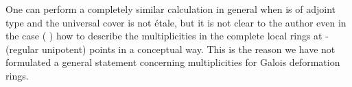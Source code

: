 \documentclass[11pt,reqno]{amsart}
\makeatletter
\theoremstyle{definition}
\DeclareMathOperator{\SL}{SL}
\newcounter{mathrecordid}
\newcommand{\mathboxbegin}[1]{%
  \stepcounter{mathrecordid}%
  \immediate\write\mathrecords{\themathrecordid,#1}%
  \special{pdf:bann << /Type /Annot /Subtype /Link /Border [0 0 0]
    /MathBoxID \themathrecordid /F 2
    /A << /S /URI /URI (urn:mathbox:\themathrecordid) >> >>}}
\newcommand{\mathboxinlineplain}[1]{$#1$}
\newcommand{\mathboxinline}[1]{%
  $\mathboxbegin{inline}%
  \special{pdf:literal direct /MathBoxBegin\themathrecordid\space MP}%
  #1\special{pdf:literal direct /MathBoxEnd\themathrecordid\space MP}%
  \special{pdf:eann}$}
\newcommand{\recordmath}{%
  \ifmeasuring@\expandafter\mathboxinlineplain
  \else\expandafter\mathboxinline\fi}
\makeatother
\begin{document}
One can perform a completely similar calculation in general when \recordmath{G} is of adjoint type and the universal cover is not \'etale, but it is not clear to the author even in the case \recordmath{G = \SL_2} (\recordmath{\ell = 2}) how to describe the multiplicities in the complete local rings at \recordmath{\Sigma}-(regular unipotent) points in a conceptual way. This is the reason we have not formulated a general statement concerning multiplicities for Galois deformation rings.
































\end{document}
